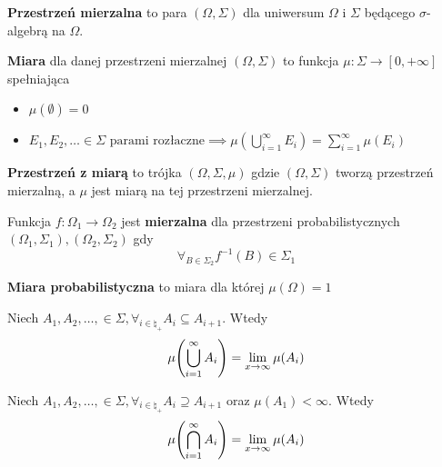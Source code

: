 \begin{definition}
	\textbf{Przestrzeń mierzalna} to para \((\Omega, \Sigma)\) dla uniwersum \(\Omega\) i \(\Sigma\) będącego \(\sigma\)-algebrą na \(\Omega\).
\end{definition}

\begin{definition}
	\textbf{Miara} dla danej przestrzeni mierzalnej \((\Omega, \Sigma)\) to funkcja \(\mu: \Sigma \to [0, +\infty]\) spełniająca
	\begin{itemize}
		\item \(\mu(\emptyset) = 0\)
		\item \(E_1, E_2, \dots \in \Sigma \text{ parami rozłaczne} \implies \mu(\bigcup_{i=1}^\infty E_i) = \sum_{i=1}^{\infty} \mu(E_i)\)
	\end{itemize}
\end{definition}

\begin{definition}
	\textbf{Przestrzeń z miarą} to trójka \((\Omega, \Sigma, \mu)\) gdzie \((\Omega, \Sigma)\) tworzą przestrzeń mierzalną, a \(\mu\) jest miarą na tej przestrzeni mierzalnej.
\end{definition}

\begin{definition}
	Funkcja \(f: \Omega_1 \to \Omega_2\) jest \textbf{mierzalna} dla przestrzeni probabilistycznych \((\Omega_1, \Sigma_1), (\Omega_2, \Sigma_2)\) gdy
	\[
		\forall_{B \in \Sigma_2} f^{-1}(B) \in \Sigma_1
	\]
\end{definition}

\begin{definition}
	\textbf{Miara probabilistyczna} to miara dla której \(\mu(\Omega) = 1\)
\end{definition}

\begin{lemma}
	Niech \(A_1, A_2, \dots, \in \Sigma, \forall_{i \in \natural_+} A_i \subseteq A_{i+1}\). Wtedy
	\[
		\mu\pars{\bigcup_{i=1}^\infty A_i} = \lim_{x \to \infty} \mu(A_i)
	\]
\end{lemma}

\begin{lemma}
	Niech \(A_1, A_2, \dots, \in \Sigma, \forall_{i \in \natural_+} A_i \supseteq A_{i+1}\) oraz \(\mu(A_1) < \infty\). Wtedy
	\[
		\mu\pars{\bigcap_{i=1}^\infty A_i} = \lim_{x \to \infty} \mu(A_i)
	\]
\end{lemma}

